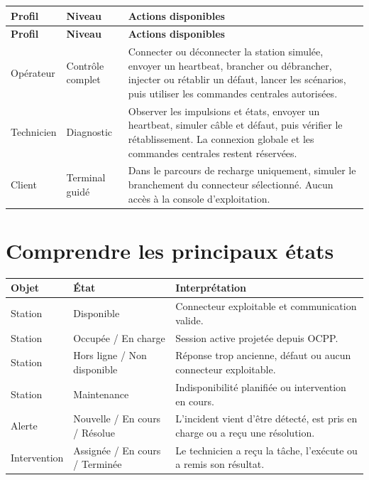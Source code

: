 \begin{longtable}{|L{3cm}|L{4.3cm}|L{8.2cm}|}
  \hline
  \textbf{Profil} & \textbf{Niveau} & \textbf{Actions disponibles} \\ \hline
  \endfirsthead
  \hline
  \textbf{Profil} & \textbf{Niveau} & \textbf{Actions disponibles} \\ \hline
  \endhead
  Opérateur & Contrôle complet & Connecter ou déconnecter la station simulée,
  envoyer un heartbeat, brancher ou débrancher, injecter ou rétablir un défaut,
  lancer les scénarios, puis utiliser les commandes centrales autorisées. \\ \hline
  Technicien & Diagnostic & Observer les impulsions et états, envoyer un
  heartbeat, simuler câble et défaut, puis vérifier le rétablissement. La
  connexion globale et les commandes centrales restent réservées. \\ \hline
  Client & Terminal guidé & Dans le parcours de recharge uniquement, simuler le
  branchement du connecteur sélectionné. Aucun accès à la console d'exploitation. \\ \hline
\end{longtable}


\section{Comprendre les principaux états}


\begingroup
\small
\renewcommand{\arraystretch}{1.08}
\begin{tabularx}{\textwidth}{|L{3.2cm}|L{4.2cm}|Y|}
  \hline
  \textbf{Objet} & \textbf{État} & \textbf{Interprétation} \\ \hline
  Station & Disponible & Connecteur exploitable et communication valide. \\ \hline
  Station & Occupée / En charge & Session active projetée depuis OCPP. \\ \hline
  Station & Hors ligne / Non disponible & Réponse trop ancienne, défaut ou aucun connecteur
  exploitable. \\ \hline
  Station & Maintenance & Indisponibilité planifiée ou intervention en cours.
  \\ \hline
  Alerte & Nouvelle / En cours / Résolue & L'incident vient d'être détecté, est
  pris en charge ou a reçu une résolution. \\ \hline
  Intervention & Assignée / En cours / Terminée & Le technicien a reçu la tâche,
  l'exécute ou a remis son résultat. \\ \hline
\end{tabularx}
\endgroup
